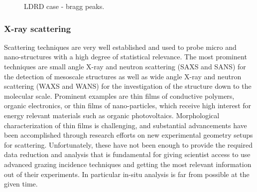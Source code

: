 \begin{figure}[!t]
\centering
{}
\hfil
{}
\caption{LDRD case - bragg peaks.}
\label{fig:ldrd}
\end{figure}



\subsubsection{X-ray scattering}\label{subsec:gisaxs} %
Scattering techniques are very well established and used to probe micro and nano-structures with a high degree of statistical relevance. The most prominent techniques are small angle X-ray and neutron scattering (SAXS and SANS) for the detection of mesoscale structures as well as wide angle X-ray and neutron scattering (WAXS and WANS) for the investigation of the structure down to the molecular scale. Prominent examples are thin films of conductive polymers, organic electronics, or thin films of nano-particles, which receive high interest for energy relevant materials such as organic photovoltaics. Morphological characterization of thin films is challenging, and substantial advancements have been accomplished through research efforts on new experimental geometry setups for scattering. Unfortunately, these have not been enough to provide the required data reduction and analysis that is fundamental for giving scientist access to use advanced grazing incidence techniques and getting the most relevant information out of their experiments. In particular in-situ analysis is far from possible at the given time.

